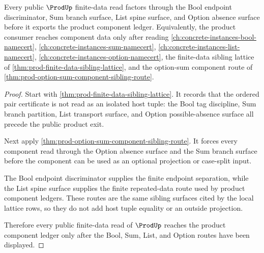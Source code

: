 \begin{theorem}
\label{thm:prod-bool-sum-list-route-audit}
Every public $\ProdUp$ finite-data read factors through the Bool endpoint discriminator, Sum branch surface, List spine surface, and Option absence surface before it exports the product component ledger. Equivalently, the product consumer reaches component data only after reading \autoref{ch:concrete-instances-bool-namecert}, \autoref{ch:concrete-instances-sum-namecert}, \autoref{ch:concrete-instances-list-namecert}, \autoref{ch:concrete-instances-option-namecert}, the finite-data sibling lattice of \autoref{thm:prod-finite-data-sibling-lattice}, and the option-sum component route of \autoref{thm:prod-option-sum-component-sibling-route}.
\end{theorem}
\begin{proof}
Start with \autoref{thm:prod-finite-data-sibling-lattice}. It records that the ordered pair certificate is not read as an isolated host tuple: the Bool tag discipline, Sum branch partition, List transport surface, and Option possible-absence surface all precede the public product exit.

Next apply \autoref{thm:prod-option-sum-component-sibling-route}. It forces every component read through the Option absence surface and the Sum branch surface before the component can be used as an optional projection or case-split input.

The Bool endpoint discriminator supplies the finite endpoint separation, while the List spine surface supplies the finite repeated-data route used by product component ledgers. These routes are the same sibling surfaces cited by the local lattice rows, so they do not add host tuple equality or an outside projection.

Therefore every public finite-data read of $\ProdUp$ reaches the product component ledger only after the Bool, Sum, List, and Option routes have been displayed.
\end{proof}
